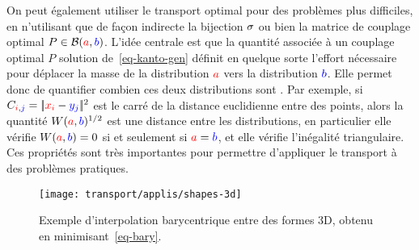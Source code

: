 On peut également utiliser le transport optimal pour des problèmes plus difficiles, en n'utilisant que de façon indirecte la bijection $\sigma$ ou bien la matrice de couplage optimal $P \in \mathcal{B}({\color{red}a},{\color{blue}b})$. L'idée centrale est que la quantité associée à un couplage optimal $P$ solution de~\eqref{eq-kanto-gen}
définit en quelque sorte l'effort nécessaire pour déplacer la masse de la distribution ${\color{red}a}$ vers la distribution ${\color{blue}b}$. Elle permet donc de quantifier combien ces deux distributions sont . Par exemple, si $C_{{\color{red}i},{\color{blue}j}} = |\!| {\color{red}x_i} - {\color{blue}y_j} |\!|^2$ est le carré de la distance euclidienne entre des points, alors la quantité $W({\color{red}a},{\color{blue}b})^{1/2}$ est une distance entre les distributions, en particulier elle vérifie $W({\color{red}a},{\color{blue}b})=0$ si et seulement si ${\color{red}a}={\color{blue}b}$, et elle vérifie l'inégalité triangulaire. Ces propriétés sont très importantes pour permettre d'appliquer le transport à des problèmes pratiques.


\begin{figure}\centering
        \texttt{[image: transport/applis/shapes-3d]}
    \caption{\label{fig:barycenters} Exemple d'interpolation barycentrique entre des formes 3D, obtenu en minimisant~\eqref{eq-bary}.  }
\end{figure}

